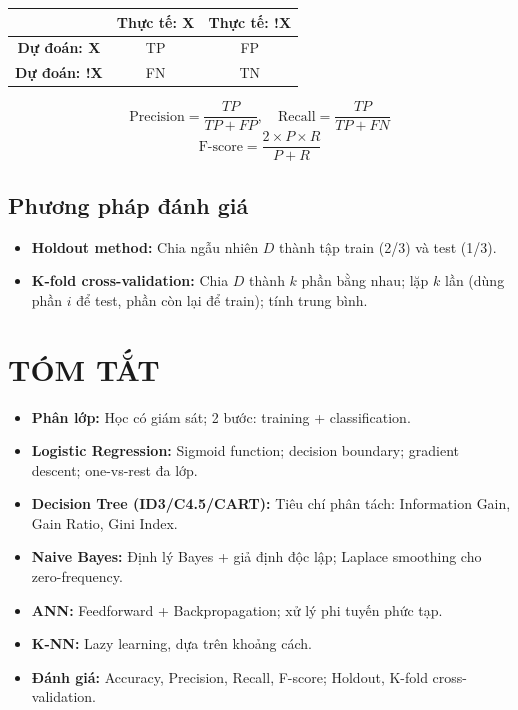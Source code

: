 \documentclass[10pt]{article}
\begin{document}
\begin{center}
\begin{tabular}{|c|c|c|}
\hline
 & \textbf{Thực tế: X} & \textbf{Thực tế: !X} \\
\hline
\textbf{Dự đoán: X} & TP & FP \\
\hline
\textbf{Dự đoán: !X} & FN & TN \\
\hline
\end{tabular}
\end{center}

\[
\text{Precision} = \frac{TP}{TP + FP}, \quad \text{Recall} = \frac{TP}{TP + FN}
\]
\[
\text{F-score} = \frac{2 \times P \times R}{P + R}
\]

\subsection{Phương pháp đánh giá}

\begin{itemize}
    \item \textbf{Holdout method:} Chia ngẫu nhiên $D$ thành tập train (2/3) và test (1/3).
    \item \textbf{K-fold cross-validation:} Chia $D$ thành $k$ phần bằng nhau; lặp $k$ lần (dùng phần $i$ để test, phần còn lại để train); tính trung bình.
\end{itemize}

\section{TÓM TẮT}

\begin{itemize}
    \item \textbf{Phân lớp:} Học có giám sát; 2 bước: training + classification.
    \item \textbf{Logistic Regression:} Sigmoid function; decision boundary; gradient descent; one-vs-rest đa lớp.
    \item \textbf{Decision Tree (ID3/C4.5/CART):} Tiêu chí phân tách: Information Gain, Gain Ratio, Gini Index.
    \item \textbf{Naive Bayes:} Định lý Bayes + giả định độc lập; Laplace smoothing cho zero-frequency.
    \item \textbf{ANN:} Feedforward + Backpropagation; xử lý phi tuyến phức tạp.
    \item \textbf{K-NN:} Lazy learning, dựa trên khoảng cách.
    \item \textbf{Đánh giá:} Accuracy, Precision, Recall, F-score; Holdout, K-fold cross-validation.
\end{itemize}
\end{document}
